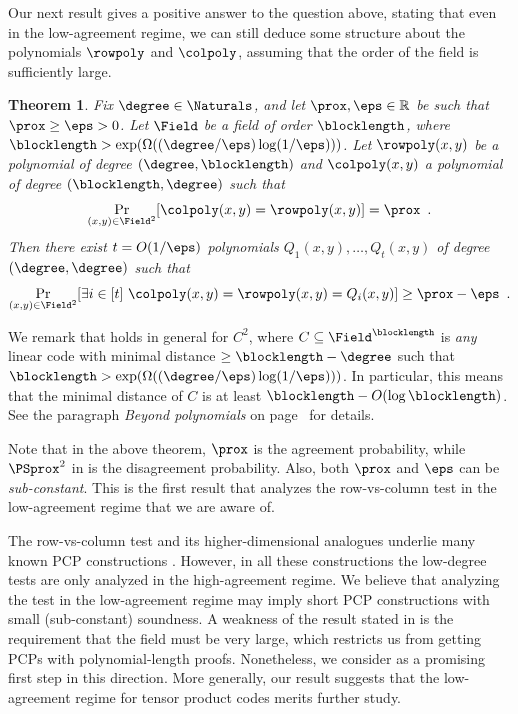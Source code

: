 \documentclass{toc}
\theoremstyle{plain}
\newtheorem{ftheorem}[theorem]{Theorem}
\begin{document}
Our next result gives a positive answer to the question above, stating that even in the low-agreement regime, we can still deduce some structure about the polynomials $\rowpoly$ and $\colpoly$, assuming that the
%
order of the field  %
is sufficiently large.

\begin{ftheorem}
\label{thm:bivar-low-agreement}
Fix $\degree \in \Naturals$, and let $\prox, \eps \in \mathbb R$ be such that $\prox \geq \eps > 0$. Let $\Field$ be a field of
%
order  %
$\blocklength$, where $\blocklength > \exp(\Omega(({\degree}/{\eps}) \log({1}/{\eps})))$. Let $\rowpoly(x,y)$ be a polynomial of degree $(\degree,\blocklength)$ and $\colpoly(x,y)$ a polynomial of degree $(\blocklength,\degree)$ such that
\begin{equation*}
\Pr_{(x,y) \in \Field^2}[\colpoly(x,y) = \rowpoly(x,y)] = \prox \enspace.
\end{equation*}
Then there exist $t = O({1}/{\eps})$ polynomials $Q_1(x,y),\dots,Q_t(x,y)$ of degree $(\degree,\degree)$ such that
\begin{equation*}
\Pr_{(x,y) \in \Field^2}
[\exists i \in [t] \ \colpoly(x,y) = \rowpoly(x,y)= Q_i(x,y)]
\geq \prox - \eps \enspace.
\end{equation*}

\end{ftheorem}

We remark that  holds in general
%
%
for $C^2$, where $C \subseteq \Field^{\blocklength}$ is \emph{any} linear code      %
with minimal distance $\geq \blocklength-\degree$ such that
$\blocklength > \exp(\Omega(({\degree}/{\eps}) \log({1}/{\eps})))$.
In particular, this means that the minimal distance of $C$ is at least $\blocklength - O(\log \blocklength)$.
See the paragraph \emph{Beyond polynomials} on page~\pageref{par:beyondpoly} for details.

Note that in the above theorem, $\prox$ is the agreement probability, while $\PSprox^{2}$ in  is the disagreement probability. Also, both $\prox$ and $\eps$ can be \emph{sub-constant}. This is the first result that analyzes the row-vs-column test
%
in the low-agreement regime that we are aware of.              %

The row-vs-column test and its higher-dimensional analogues underlie many known PCP constructions \cite{BabaiFL91, BabaiFLS91, PolishchukS94, BenSassonS08}.
However, in all these constructions the
%
low-degree tests are only analyzed in the
%
high-agreement regime.   %
We believe that analyzing the test in the low-agreement regime may imply short PCP constructions with small (sub-constant) soundness.
A weakness of the result stated in  is the requirement that the field
%
must be very large,
which restricts us from getting PCPs with
%
polynomial-length proofs.  %
Nonetheless, we consider  as a promising first step in this direction.
More generally, our result suggests that the low-agreement regime for tensor product codes merits further study.
\end{document}
